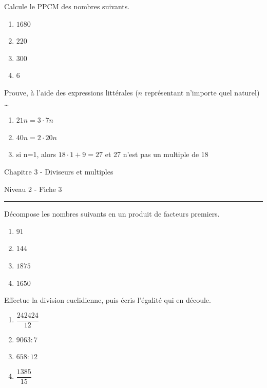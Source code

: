 \documentclass[12pt,parskip=half-, twoside=semi]{scrartcl}
\begin{document}
  \begin{exercise}
    Calcule le PPCM des nombres suivants.
      \begin{enumerate}[cols=2]
        \item $1680$
        \item $220$
        \item $300$
        \item $6$
      \end{enumerate}
  \end{exercise}
  
  \begin{exercise}
    Prouve, à l'aide des expressions littérales (\(n\) représentant n'importe quel naturel) \dots 
    \begin{enumerate}
      \item \(21n = 3 \cdot 7n\)
      \item \(40n = 2 \cdot 20n\)
      \item si n=1, alors \(18\cdot 1 + 9 = 27\) et 27 n'est pas un multiple de 18
    \end{enumerate}
  \end{exercise}
      
\newpage


\begin{center}
  \bfseries
  \begin{Huge}
    Chapitre 3 - Diviseurs et multiples
  \end{Huge}
  \smallbreak
  \begin{large}
    Niveau 2  - Fiche 3
  \end{large}
  \smallbreak
  \rule[10pt]{.5\linewidth}{1 pt}
\end{center}

\setcounter{exercise}{0}
      
      \begin{exercise}
        Décompose les nombres suivants en un produit de facteurs premiers.
          \begin{enumerate}[cols=2]
            \item $91$
            \item $144$
            \item $1875$
            \item $1650$
          \end{enumerate}
      \end{exercise}
      
      \begin{exercise}
        Effectue la division euclidienne, puis écris l'égalité qui en découle. 
          \begin{enumerate}[cols=2]
            \item $\dfrac{242424}{12}$
            \item $9063 : 7 $
            \item $658 : 12$
            \item $\dfrac{1385}{15}$
          \end{enumerate}
      \end{exercise}
      
\end{document}
